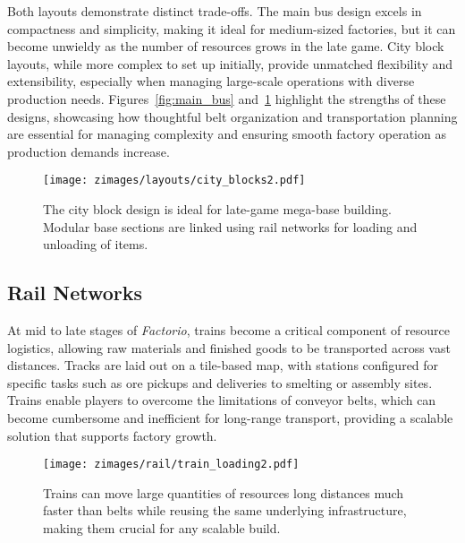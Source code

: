 Both layouts demonstrate distinct trade-offs. The main bus design excels in compactness and simplicity, making it ideal for medium-sized factories, but it can become unwieldy as the number of resources grows in the late game. City block layouts, while more complex to set up initially, provide unmatched flexibility and extensibility, especially when managing large-scale operations with diverse production needs. Figures~\ref{fig:main_bus} and~\ref{fig:city_block} highlight the strengths of these designs, showcasing how thoughtful belt organization and transportation planning are essential for managing complexity and ensuring smooth factory operation as production demands increase.

\begin{figure}[ht]
    \centering
    \texttt{[image: zimages/layouts/city\_blocks2.pdf]}
    \caption{The city block design is ideal for late-game mega-base building. Modular base sections are linked using rail networks for loading and unloading of items. \cite{cityBlock}}
    \label{fig:city_block}
\end{figure}




\subsection{Rail Networks}

At mid to late stages of \textit{Factorio}, trains become a critical component of resource logistics, allowing raw materials and finished goods to be transported across vast distances. Tracks are laid out on a tile-based map, with stations configured for specific tasks such as ore pickups and deliveries to smelting or assembly sites. Trains enable players to overcome the limitations of conveyor belts, which can become cumbersome and inefficient for long-range transport, providing a scalable solution that supports factory growth.

\begin{figure}[ht]
    \centering
    \texttt{[image: zimages/rail/train\_loading2.pdf]}
    \caption{Trains can move large quantities of resources long distances much faster than belts while reusing the same underlying infrastructure, making them crucial for any scalable build. \cite{trainUnloading}}
    \label{fig:_train_loading}
\end{figure}

